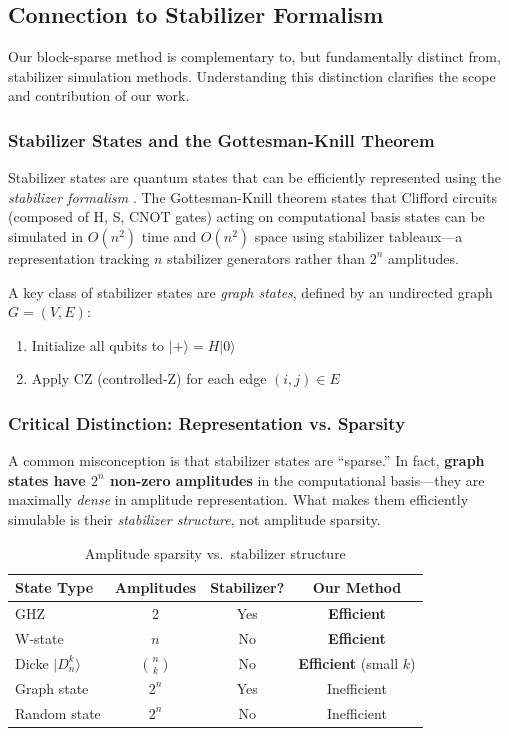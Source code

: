 \documentclass[11pt,twocolumn]{article}
\begin{document}
\subsection{Connection to Stabilizer Formalism}

Our block-sparse method is complementary to, but fundamentally distinct from, stabilizer simulation methods. Understanding this distinction clarifies the scope and contribution of our work.

\subsubsection{Stabilizer States and the Gottesman-Knill Theorem}

Stabilizer states are quantum states that can be efficiently represented using the \emph{stabilizer formalism} \cite{gottesman1998}. The Gottesman-Knill theorem states that Clifford circuits (composed of H, S, CNOT gates) acting on computational basis states can be simulated in $O(n^2)$ time and $O(n^2)$ space using stabilizer tableaux---a representation tracking $n$ stabilizer generators rather than $2^n$ amplitudes.

A key class of stabilizer states are \emph{graph states}, defined by an undirected graph $G = (V, E)$:
\begin{enumerate}
    \item Initialize all qubits to $|+\rangle = H|0\rangle$
    \item Apply CZ (controlled-Z) for each edge $(i,j) \in E$
\end{enumerate}

\subsubsection{Critical Distinction: Representation vs. Sparsity}

A common misconception is that stabilizer states are ``sparse.'' In fact, \textbf{graph states have $2^n$ non-zero amplitudes} in the computational basis---they are maximally \emph{dense} in amplitude representation. What makes them efficiently simulable is their \emph{stabilizer structure}, not amplitude sparsity.

\begin{table}[H]
\centering
\caption{Amplitude sparsity vs.\ stabilizer structure}
\label{tab:stabcomp}
\begin{tabular}{@{}lccc@{}}
\toprule
State Type & Amplitudes & Stabilizer? & Our Method \\
\midrule
GHZ & 2 & Yes & \textbf{Efficient} \\
W-state & $n$ & No & \textbf{Efficient} \\
Dicke $|D_n^k\rangle$ & $\binom{n}{k}$ & No & \textbf{Efficient} (small $k$) \\
Graph state & $2^n$ & Yes & Inefficient \\
Random state & $2^n$ & No & Inefficient \\
\bottomrule
\end{tabular}
\end{table}
\end{document}
